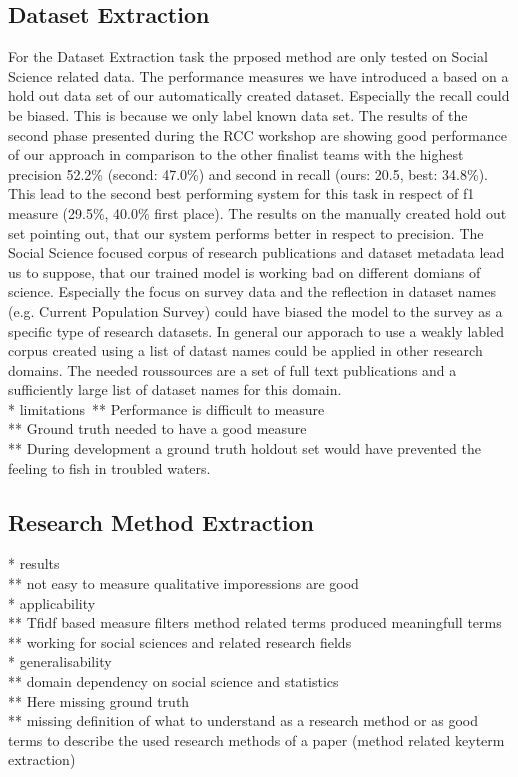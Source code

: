 \subsection{Dataset Extraction}
For the Dataset Extraction task the prposed method are only tested on Social Science related data.
The performance measures we have introduced a based on a hold out data set of our automatically created dataset.
Especially the recall could be biased.
This is because we only label known data set.
The results of the second phase presented during the RCC workshop are showing good performance of our approach in comparison to the other finalist teams with the highest precision 52.2\% (second: 47.0\%)
and second in recall (ours: 20.5, best: 34.8\%).
This lead to the second best performing system for this task in respect of f1 measure (29.5\%, 40.0\% first place).
The results on the manually created hold out set pointing out, that our system performs better in respect to precision.
The Social Science focused corpus of research publications and dataset metadata lead us to suppose, that our trained model is working bad on different domians of science.
Especially the focus on survey data and the reflection in dataset names (e.g. Current Population Survey) could have biased the model to the survey as a specific type of research datasets.
In general our apporach to use a weakly labled corpus created using a list of datast names could be applied in other research domains.
The needed roussources are a set of full text publications and a sufficiently large list of dataset names for this domain.
\\
* limitations\
**    Performance is difficult to measure\\
**    Ground truth needed to have a good measure\\
**    During development a ground truth holdout set would have prevented the feeling to fish in troubled waters.\\


\subsection{Research Method Extraction}
* results\\
**    not easy to measure qualitative imporessions are good\\
* applicability\\
**    Tfidf based measure filters method related terms produced meaningfull terms\\
**    working for social sciences and related research fields\\
* generalisability\\
**    domain dependency on social science and statistics\\
**    Here missing ground truth\\
**   missing definition of what to understand as a research method or as good terms to describe the used research methods of a paper (method related keyterm extraction)\\

